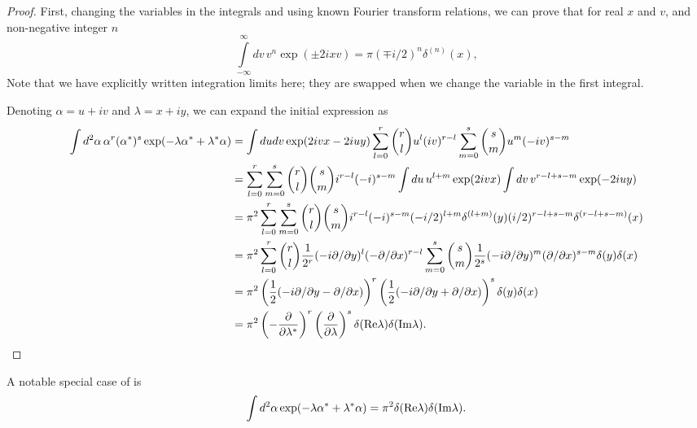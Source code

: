 \begin{proof}
First, changing the variables in the integrals and using known Fourier transform relations, we can prove that for real $x$ and $v$, and non-negative integer $n$
\[
	\int\limits_{-\infty}^{\infty} dv\, v^n \exp(\pm 2 i x v)
	= \pi (\mp i / 2)^n \delta^{(n)}(x),
\]
Note that we have explicitly written integration limits here;
they are swapped when we change the variable in the first integral.

Denoting $\alpha = u + iv$ and $\lambda = x + iy$, we can expand the initial expression as
\begin{equation*}
\begin{split}
	\int d^2\alpha\, \alpha^r (\alpha^*)^s \exp(-\lambda \alpha^* + \lambda^* \alpha)
	& = \int du dv \exp(2ivx - 2iuy)
		\sum_{l=0}^r \binom{r}{l} u^l (iv)^{r-l}
		\sum_{m=0}^s \binom{s}{m} u^m (-iv)^{s-m} \\
	& = \sum_{l=0}^r \sum_{m=0}^s \binom{r}{l} \binom{s}{m}
		i^{r-l} (-i)^{s-m}
		\int du\, u^{l+m} \exp(2ivx)
		\int dv\, v^{r-l+s-m} \exp(-2iuy) \\
	& = \pi^2 \sum_{l=0}^r \sum_{m=0}^s \binom{r}{l} \binom{s}{m}
		i^{r-l} (-i)^{s-m}
		(-i/2)^{l+m} \delta^{(l+m)}(y)
		(i/2)^{r-l+s-m} \delta^{(r-l+s-m)}(x) \\
	& = \pi^2
		\sum_{l=0}^r \binom{r}{l}
			\frac{1}{2^r}
			(-i \partial / \partial y)^l
			(-\partial / \partial x)^{r-l}
		\sum_{m=0}^s \binom{s}{m}
			\frac{1}{2^s}
			(-i \partial / \partial y)^m
			(\partial / \partial x)^{s-m}
		\delta(y) \delta(x) \\
	& = \pi^2
		\left( \frac{1}{2} (-i \partial / \partial y - \partial / \partial x) \right)^r
		\left( \frac{1}{2} (-i \partial / \partial y + \partial / \partial x) \right)^s
		\delta(y) \delta(x) \\
	& = \pi^2
		\left( -\frac{\partial}{\partial \lambda^*} \right)^r
		\left( \frac{\partial}{\partial \lambda} \right)^s
		\delta(\mathrm{Re} \lambda) \delta(\mathrm{Im} \lambda).
		\qedhere
\end{split}
\end{equation*}
\end{proof}

A notable special case of  is
\[
	\int d^2\alpha \exp(-\lambda \alpha^* + \lambda^* \alpha)
	= \pi^2 \delta(\mathrm{Re} \lambda) \delta(\mathrm{Im} \lambda).
\]

